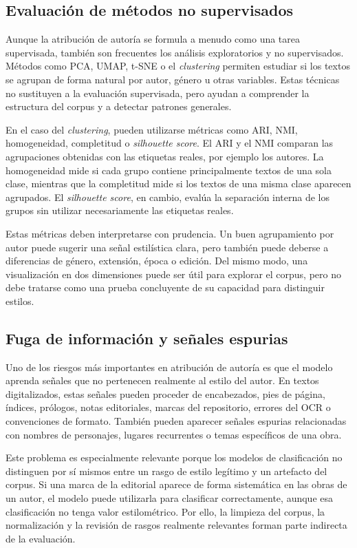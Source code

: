 \documentclass[IB]{TFUOC}%
\begin{document}
\subsection{Evaluación de métodos no supervisados}

Aunque la atribución de autoría se formula a menudo como una tarea supervisada, también son frecuentes los análisis exploratorios y no supervisados. Métodos como PCA, UMAP, t-SNE o el \textit{clustering} permiten estudiar si los textos se agrupan de forma natural por autor, género u otras variables\cite{papcke2023stylometric}. Estas técnicas no sustituyen a la evaluación supervisada, pero ayudan a comprender la estructura del corpus y a detectar patrones generales.

En el caso del \textit{clustering}, pueden utilizarse métricas como ARI, NMI, homogeneidad, completitud o \textit{silhouette score}. El ARI y el NMI comparan las agrupaciones obtenidas con las etiquetas reales, por ejemplo los autores. La homogeneidad mide si cada grupo contiene principalmente textos de una sola clase, mientras que la completitud mide si los textos de una misma clase aparecen agrupados. El \textit{silhouette score}, en cambio, evalúa la separación interna de los grupos sin utilizar necesariamente las etiquetas reales.

Estas métricas deben interpretarse con prudencia. Un buen agrupamiento por autor puede sugerir una señal estilística clara, pero también puede deberse a diferencias de género, extensión, época o edición. Del mismo modo, una visualización en dos dimensiones puede ser útil para explorar el corpus, pero no debe tratarse como una prueba concluyente de su capacidad para distinguir estilos.

\subsection{Fuga de información y señales espurias}

Uno de los riesgos más importantes en atribución de autoría es que el modelo aprenda señales que no pertenecen realmente al estilo del autor. En textos digitalizados, estas señales pueden proceder de encabezados, pies de página, índices, prólogos, notas editoriales, marcas del repositorio, errores del OCR o convenciones de formato. También pueden aparecer señales espurias relacionadas con nombres de personajes, lugares recurrentes o temas específicos de una obra.

Este problema es especialmente relevante porque los modelos de clasificación no distinguen por sí mismos entre un rasgo de estilo legítimo y un artefacto del corpus. Si una marca de la editorial aparece de forma sistemática en las obras de un autor, el modelo puede utilizarla para clasificar correctamente, aunque esa clasificación no tenga valor estilométrico. Por ello, la limpieza del corpus, la normalización y la revisión de rasgos realmente relevantes forman parte indirecta de la evaluación.
\end{document}
